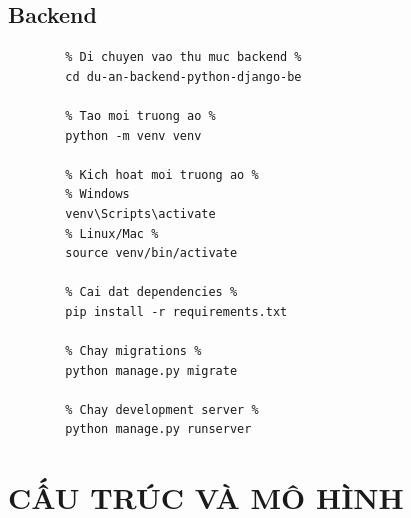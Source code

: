 \documentclass[a4paper]{article}
\begin{document}
    \subsection{Backend}
        \begin{mdframed}
        [hidealllines=true,backgroundcolor=magenta!10]
		\begin{lstlisting}
        % Di chuyen vao thu muc backend %
        cd du-an-backend-python-django-be 
        
        % Tao moi truong ao %
        python -m venv venv
        
        % Kich hoat moi truong ao %
        % Windows
        venv\Scripts\activate
        % Linux/Mac %
        source venv/bin/activate
        
        % Cai dat dependencies %
        pip install -r requirements.txt
        
        % Chay migrations %
        python manage.py migrate
        
        % Chay development server %
        python manage.py runserver
        \end{lstlisting}
    \end{mdframed}

 \section{CẤU TRÚC VÀ MÔ HÌNH}
\end{document}
